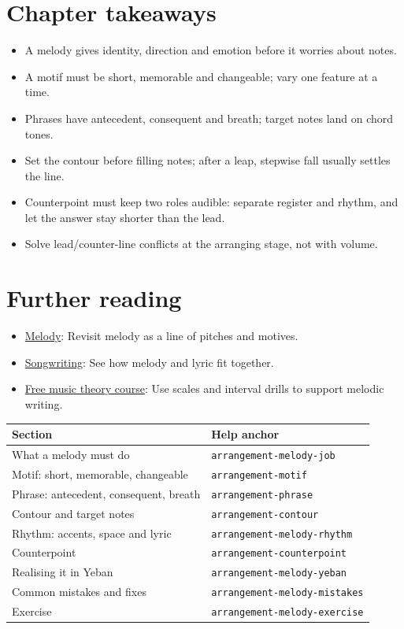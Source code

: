 \section{Chapter takeaways}
\label{sec:melody-takeaways}

\begin{itemize}
\item A melody gives identity, direction and emotion before it worries about notes.
\item A motif must be short, memorable and changeable; vary one feature at a time.
\item Phrases have antecedent, consequent and breath; target notes land on chord tones.
\item Set the contour before filling notes; after a leap, stepwise fall usually settles the line.
\item Counterpoint must keep two roles audible: separate register and rhythm, and let the answer stay shorter than the lead.
\item Solve lead/counter-line conflicts at the arranging stage, not with volume.
\end{itemize}

\section{Further reading}
\label{sec:05-melody-further-reading}
\begin{itemize}
  \item \href{https://en.wikipedia.org/wiki/Melody}{Melody}: Revisit melody as a line of pitches and motives.
  \item \href{https://en.wikipedia.org/wiki/Songwriting}{Songwriting}: See how melody and lyric fit together.
  \item \href{https://www.youtube.com/watch?v=6gHEIF0rT2w}{Free music theory course}: Use scales and interval drills to support melodic writing.
\end{itemize}

\begin{helpmapping}
\begin{longtable}{p{}p{}}
\toprule
Section & Help anchor \\
\midrule
What a melody must do & \texttt{arrangement-melody-job} \\
Motif: short, memorable, changeable & \texttt{arrangement-motif} \\
Phrase: antecedent, consequent, breath & \texttt{arrangement-phrase} \\
Contour and target notes & \texttt{arrangement-contour} \\
Rhythm: accents, space and lyric & \texttt{arrangement-melody-rhythm} \\
Counterpoint & \texttt{arrangement-counterpoint} \\
Realising it in Yeban & \texttt{arrangement-melody-yeban} \\
Common mistakes and fixes & \texttt{arrangement-melody-mistakes} \\
Exercise & \texttt{arrangement-melody-exercise} \\
\bottomrule
\end{longtable}
\end{helpmapping}
